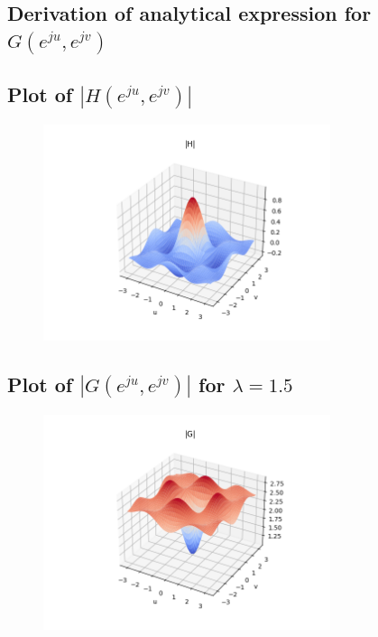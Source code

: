 \documentclass{article}
\begin{document}
\subsection{Derivation of analytical expression for $G(e^{ju}, e^{jv})$}
\subsection{Plot of $|H(e^{ju}, e^{jv})|$}
\begin{figure}[H]
    \centering
    \includegraphics[width=0.75\textwidth]{../results/section4-H-python.png}
    \begin{center}
    \end{center}
\end{figure}
\subsection{Plot of $|G(e^{ju}, e^{jv})|$ for $\lambda = 1.5$}
\begin{figure}[H]
    \centering
    \includegraphics[width=0.75\textwidth]{../results/section4-G-python.png}
    \begin{center}
    \end{center}
\end{figure}
\end{document}
